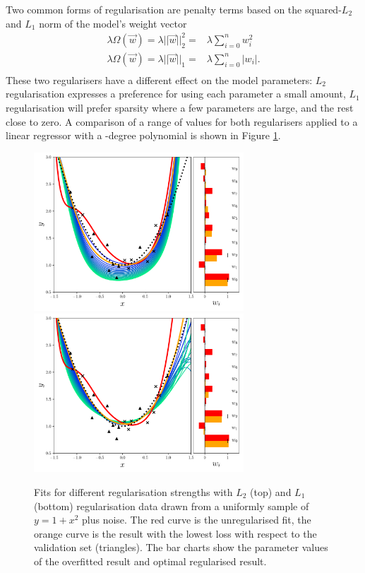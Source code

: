 Two common forms of regularisation are penalty terms based on the squared-$L_{2}$ and $L_{1}$ norm of the model's weight vector
\begin{equation}
    \begin{split}
        \lambda\Omega(\vec{w}) = \lambda||\vec{w}||^{2}_{2} =& \lambda\sum_{i=0}^{n}w_{i}^{2} \\
        \lambda\Omega(\vec{w}) = \lambda||\vec{w}||_{1} =& \lambda\sum_{i=0}^{n}|w_{i}|. \\
    \end{split}
\end{equation}
These two regularisers have a different effect on the model parameters: $L_{2}$ regularisation expresses a preference for using each parameter a small amount, $L_{1}$ regularisation will prefer sparsity where a few parameters are large, and the rest close to zero. 
A comparison of a range of values for both regularisers applied to a linear regressor with a -degree polynomial is shown in Figure \ref{fig:machine_learning:reg_example}. 
\begin{figure}[h!]
    \begin{center}
        \includegraphics[width=0.7\textwidth]{figures/machine_learning/L2_reg_plot.pdf}
        \includegraphics[width=0.7\textwidth]{figures/machine_learning/L1_reg_plot.pdf}
    \end{center}
    \caption{Fits for different regularisation strengths with $L_{2}$ (top) and $L_{1}$ (bottom) regularisation data drawn from a uniformly sample of $y=1+x^{2}$ plus noise. The red curve is the unregularised fit, the orange curve is the result with the lowest loss with respect to the validation set (triangles). The bar charts show the parameter values of the overfitted result and optimal regularised result.} 
        \label{fig:machine_learning:reg_example}
\end{figure}

